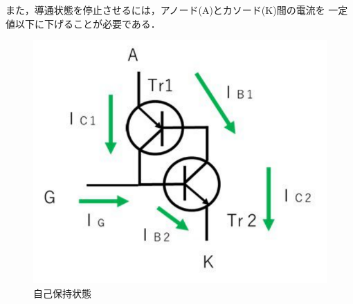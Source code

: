 \begin{enumerate}
\begin{description}
        また，導通状態を停止させるには，アノード(A)とカソード(K)間の電流を
        一定値以下に下げることが必要である．
        \begin{figure}[H]
            \begin{center}
                \includegraphics[scale=0.5]{figure6.pdf}
                \caption{自己保持状態}
            \end{center}
        \end{figure}

    \end{description}
\end{enumerate}